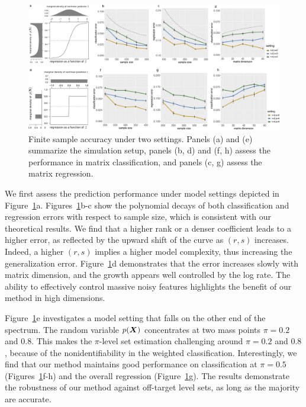 \documentclass[11pt]{article}
\theoremstyle{definition}
\begin{document}
\begin{figure}[H]
\centering
\includegraphics[width=1\textwidth]{combined.pdf}
\caption{Finite sample accuracy under two settings. Panels (a) and (e) summarize the simulation setup, panels (b, d) and (f, h) assess the performance in matrix classification, and panels (c, g) assess the matrix regression. }\label{fig:logistic}
\vspace{-.8cm}
\end{figure}

We first assess the prediction performance under model settings depicted in Figure~\ref{fig:logistic}a. 
Figures~\ref{fig:logistic}b-c show the polynomial decays of both classification and regression errors with respect to sample size, which is consistent with our theoretical results. We find that a higher rank or a denser coefficient leads to a higher error, as reflected by the upward shift of the curve as $(r,s)$ increases. Indeed, a higher $(r,s)$ implies a higher model complexity, thus increasing the generalization error. Figure~\ref{fig:logistic}d demonstrates that the error increases slowly with matrix dimension, and the growth appears well controlled by the log rate. The ability to effectively control massive noisy features highlights the benefit of our method in high dimensions. 

Figure~\ref{fig:logistic}e investigates a model setting that falls on the other end of the spectrum. The random variable $p(\bm X)$ concentrates at two mass points $\pi=0.2$ and $0.8$. This makes the $\pi$-level set estimation challenging around $\pi=0.2$ and $0.8$, because of the nonidentifiability in the weighted classification. Interestingly, we find that our method maintains good performance on classification at $\pi=0.5$ (Figures~\ref{fig:logistic}f-h) and the overall regression (Figure~\ref{fig:logistic}g). The results demonstrate the robustness of our method against off-target level sets, as long as the majority are accurate.
\end{document}
